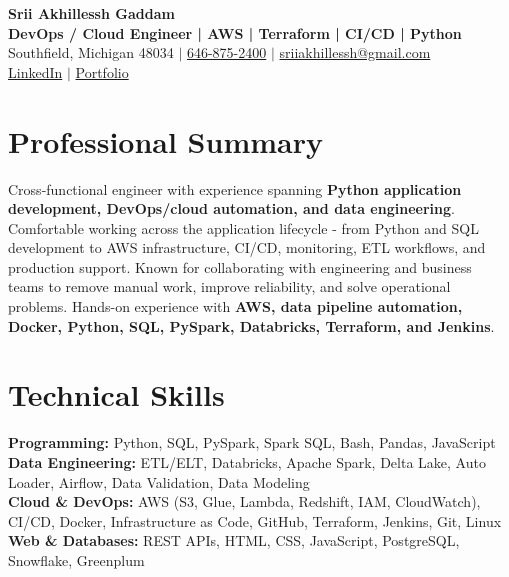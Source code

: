\documentclass[letterpaper,10pt]{article}
\begin{document}
\fontsize{9.35pt}{10.45pt}\selectfont

\begin{center}
    {\LARGE \textbf{Srii Akhillessh Gaddam}} \\[-1pt]
    \textbf{DevOps / Cloud Engineer | AWS | Terraform | CI/CD | Python} \\[2pt]
    Southfield, Michigan 48034 $|$
    \href{tel:6468752400}{646-875-2400} $|$
    \href{mailto:sriiakhillessh@gmail.com}{sriiakhillessh@gmail.com} \\[1pt]
    \href{https://www.linkedin.com/in/srii-akhiilessh-gaddam-b48668191/}{LinkedIn} $|$
    \href{https://sriiakhillesshg.github.io/portfolio/}{Portfolio}
\end{center}
\vspace{-8pt}

\section{Professional Summary}
\small{Cross-functional engineer with experience spanning \textbf{Python application development, DevOps/cloud automation, and data engineering}. Comfortable working across the application lifecycle - from Python and SQL development to AWS infrastructure, CI/CD, monitoring, ETL workflows, and production support. Known for collaborating with engineering and business teams to remove manual work, improve reliability, and solve operational problems. Hands-on experience with \textbf{AWS, data pipeline automation, Docker, Python, SQL, PySpark, Databricks, Terraform, and Jenkins}.}

\section{Technical Skills}
\small{
\textbf{Programming:} Python, SQL, PySpark, Spark SQL, Bash, Pandas, JavaScript \\
\textbf{Data Engineering:} ETL/ELT, Databricks, Apache Spark, Delta Lake, Auto Loader, Airflow, Data Validation, Data Modeling \\
\textbf{Cloud \& DevOps:} AWS (S3, Glue, Lambda, Redshift, IAM, CloudWatch), CI/CD, Docker, Infrastructure as Code, GitHub, Terraform, Jenkins, Git, Linux \\
\textbf{Web \& Databases:} REST APIs, HTML, CSS, JavaScript, PostgreSQL, Snowflake, Greenplum
}
\end{document}
